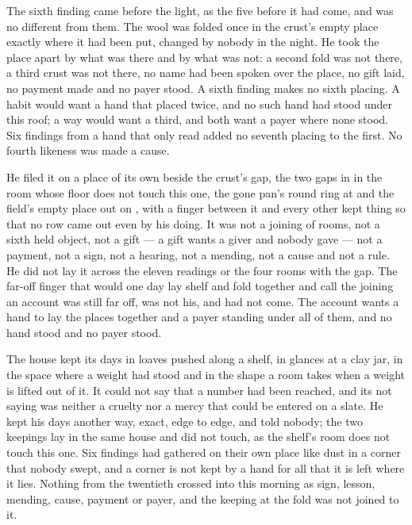 \scenebreak

The sixth finding came before the light, as the five before it had come, and was no different from them. The wool was folded once in the crust's empty place exactly where it had been put, changed by nobody in the night. He took the place apart by what was there and by what was not: a second fold was not there, a third crust was not there, no name had been spoken over the place, no gift laid, no payment made and no payer stood. A sixth finding makes no sixth placing. A habit would want a hand that placed twice, and no such hand had stood under this roof; a way would want a third, and both want a payer where none stood. Six findings from a hand that only read added no seventh placing to the first. No fourth likeness was made a cause.

He filed it on a place of its own beside the crust's gap, the two gaps in  in the room whose floor does not touch this one, the gone pan's round ring at  and the field's empty place out on , with a finger between it and every other kept thing so that no row came out even by his doing. It was not a joining of rooms, not a sixth held object, not a gift --- a gift wants a giver and nobody gave --- not a payment, not a sign, not a hearing, not a mending, not a cause and not a rule. He did not lay it across the eleven readings or the four rooms with the gap. The far-off finger that would one day lay shelf and fold together and call the joining an account was still far off, was not his, and had not come. The account wants a hand to lay the places together and a payer standing under all of them, and no hand stood and no payer stood.

The house kept its days in loaves pushed along a shelf, in glances at a clay jar, in the space where a weight had stood and in the shape a room takes when a weight is lifted out of it. It could not say that a number had been reached, and its not saying was neither a cruelty nor a mercy that could be entered on a slate. He kept his days another way, exact, edge to edge, and told nobody; the two keepings lay in the same house and did not touch, as the shelf's room does not touch this one. Six findings had gathered on their own place like dust in a corner that nobody swept, and a corner is not kept by a hand for all that it is left where it lies. Nothing from the twentieth crossed into this morning as sign, lesson, mending, cause, payment or payer, and the keeping at the fold was not joined to it.

